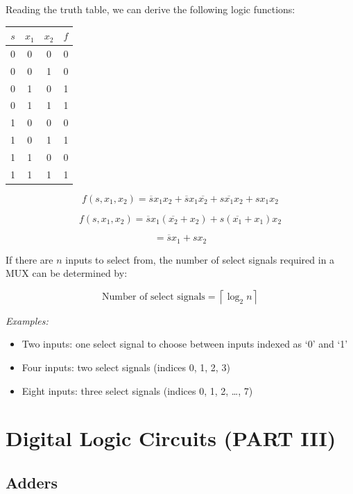 \documentclass[12pt,openany, tikz,border=10pt]{book}
\begin{document}
Reading the truth table, we can derive the following logic functions:
\begin{table}[h!]
    \centering
    \begin{tabular}{cccc}
      \hline
      $s$ & $x_1$ & $x_2$ & $f$ \\
      \hline
      0 & 0 & 0 & 0 \\
      0 & 0 & 1 & 0 \\
      0 & 1 & 0 & 1 \\
      0 & 1 & 1 & 1 \\
      1 & 0 & 0 & 0 \\
      1 & 0 & 1 & 1 \\
      1 & 1 & 0 & 0 \\
      1 & 1 & 1 & 1 \\
      \hline
    \end{tabular}
  \end{table}
\[
f(s, x_1, x_2) = \overline{s} x_1 x_2 + \overline{s} x_1 \overline{x_2} + s \overline{x_1} x_2 + s x_1 x_2
\]

\[
f(s, x_1, x_2) = \overline{s}x_1 (\overline{x_2} + x_2) + s(\overline{x_1} + x_1)x_2
\]

\[
= \overline{s}x_1 + sx_2
\]



If there are \( n \) inputs to select from, the number of select signals required in a MUX can be determined by:

\[
\text{Number of select signals} = \left\lceil \log_2 n \right\rceil
\]

\textit{Examples:}
\begin{itemize}
    \item[] Two inputs: one select signal to choose between inputs indexed as `0' and `1'
    \item[] Four inputs: two select signals (indices 0, 1, 2, 3)
    \item[] Eight inputs: three select signals (indices 0, 1, 2, \ldots, 7)
\end{itemize}



\chapter{Digital Logic Circuits (PART III)}
\section{Adders}
\end{document}

